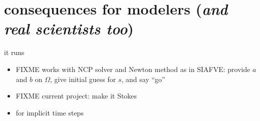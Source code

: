 \documentclass[10pt,hyperref,dvipsnames]{beamer}
\begin{document}
\section{consequences for modelers (\emph{and real scientists too})}

\begin{frame}{it runs}
\begin{itemize}
\item FIXME works with NCP solver and Newton method as in SIAFVE: provide $a$ and $b$ on $\Omega$, give initial guess for $s$, and say ``go''
\item FIXME current project: make it Stokes
\item for implicit time steps
\end{itemize}
\end{frame}
\end{document}
